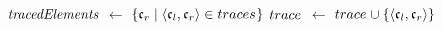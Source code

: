 \begin{algorithmic}[1]
        \State $\mathit{tracedElements}$ $\leftarrow$ $\{ \mathfrak{c}_{r} \mid \langle \mathfrak{c}_{l}, \mathfrak{c}_{r} \rangle \in traces_{} \}$
         \label{algo:synchronization:findcorrespondingelements:line:explicit}
                \State {}
            \EndIf
        \EndFor
         \label{algo:synchronization:findcorrespondingelements:line:implicit}
                \State $trace_{}$ $\leftarrow$ $trace_{} \cup \{ \langle \mathfrak{c}_{l},\mathfrak{c}_{r} \rangle \}$
                \State {}
            \EndIf 
        \EndFor
        \State {}
    \EndProcedure
\end{algorithmic}